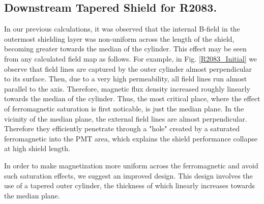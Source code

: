\documentclass[12pt]{article}
\begin{document}
\subsection{Downstream Tapered  Shield for R2083.}
In our previous calculations, it was observed that the 
internal B-field  in the outermost shielding layer was 
non-uniform across the length of the shield, becoming greater
towards the median of the cylinder.
This effect may be seen from any calculated field map as follows.
For example, in Fig. \ref{R2083_Initial}
we observe that field lines are captured  by the outer cylinder almost perpendicular
to its surface. Then, due to a very high permeability, all field lines
run  almost parallel to the axis. Therefore,  magnetic flux density 
increased roughly linearly towards the median of the cylinder. 
Thus, the  most critical  place, where the  effect of  ferromagnetic saturation is first noticable, is just the median plane. In the vicinity of the median plane, 
the external field lines are almost perpendicular. 
Therefore they efficiently penetrate through a "hole" created by a 
saturated ferromagnetic into the PMT area, which explains the shield performance
collapse at high shield length. 

In order to make magnetization more uniform across the ferromagnetic and avoid such saturation effects,
we suggest an improved design. This design involves the use of a tapered outer cylinder,
the thickness of which linearly increases towards the median plane.
\end{document}
